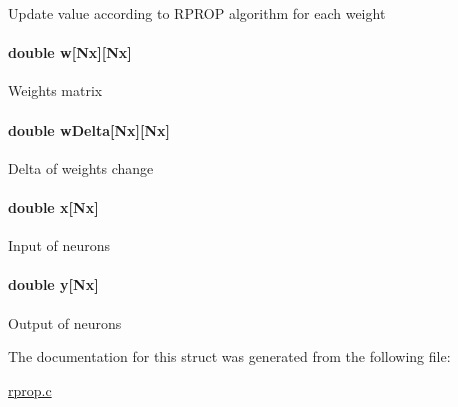 Update value according to R\+P\+R\+O\+P algorithm for each weight \hypertarget{structann__t_aee905c93142ba709a90118c788622185}{
\paragraph[{w}]{\setlength{\rightskip}{0pt plus 5cm}double w\mbox{[}Nx\mbox{]}\mbox{[}Nx\mbox{]}}}\label{structann__t_aee905c93142ba709a90118c788622185}
Weights matrix \hypertarget{structann__t_a19e899724a3a7ab9150e22e0d48ebc3e}{
\paragraph[{w\+Delta}]{\setlength{\rightskip}{0pt plus 5cm}double w\+Delta\mbox{[}Nx\mbox{]}\mbox{[}Nx\mbox{]}}}\label{structann__t_a19e899724a3a7ab9150e22e0d48ebc3e}
Delta of weights change \hypertarget{structann__t_ac566dbcdd25e058c1e82f59d63dfd12b}{
\paragraph[{x}]{\setlength{\rightskip}{0pt plus 5cm}double x\mbox{[}Nx\mbox{]}}}\label{structann__t_ac566dbcdd25e058c1e82f59d63dfd12b}
Input of neurons \hypertarget{structann__t_adec9cbbd838a286742a4ae286bff0e30}{
\paragraph[{y}]{\setlength{\rightskip}{0pt plus 5cm}double y\mbox{[}Nx\mbox{]}}}\label{structann__t_adec9cbbd838a286742a4ae286bff0e30}
Output of neurons 

The documentation for this struct was generated from the following file\+:\begin{DoxyCompactItemize}
\item 
\hyperlink{rprop_8c}{rprop.\+c}\end{DoxyCompactItemize}
